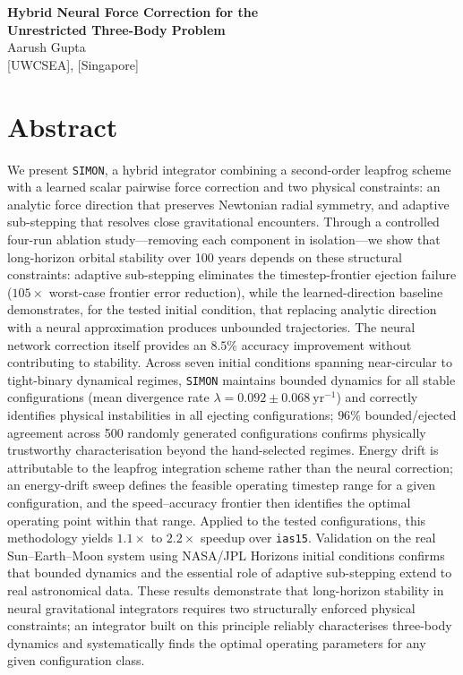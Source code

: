 \documentclass[12pt]{article}
\begin{document}
\newpage
{}
\setcounter{page}{1}
\thispagestyle{plain}

\begin{center}
  {\Large \textbf{Hybrid Neural Force Correction for the\\[0.2cm]
   Unrestricted Three-Body Problem}}\\[0.8cm]
  {\large Aarush Gupta}\\[0.3cm]
  {\small [UWCSEA], [Singapore]}\\[1cm]
\end{center}

\section*{Abstract}

We present \texttt{SIMON}, a hybrid integrator combining a second-order
leapfrog scheme with a learned scalar pairwise force correction and two
physical constraints: an analytic force direction that preserves Newtonian
radial symmetry, and adaptive sub-stepping that resolves close gravitational
encounters. Through a controlled four-run ablation study---removing each
component in isolation---we show that long-horizon orbital stability over
100 years depends on these structural constraints: adaptive sub-stepping
eliminates the timestep-frontier ejection failure ($105\times$ worst-case
frontier error reduction), while the learned-direction baseline demonstrates,
for the tested initial condition, that replacing analytic direction with a
neural approximation produces unbounded trajectories. The neural network
correction itself provides an $8.5\%$ accuracy improvement without
contributing to stability. Across seven initial conditions spanning
near-circular to tight-binary dynamical regimes, \texttt{SIMON} maintains
bounded dynamics for all stable configurations (mean divergence rate
$\lambda = 0.092 \pm 0.068\ \mathrm{yr}^{-1}$) and correctly identifies
physical instabilities in all ejecting configurations; $96\%$ bounded/ejected
agreement across 500 randomly generated configurations confirms physically
trustworthy characterisation beyond the hand-selected regimes. Energy drift
is attributable to the leapfrog integration scheme rather than the neural
correction; an energy-drift sweep defines the feasible operating timestep
range for a given configuration, and the speed--accuracy frontier then
identifies the optimal operating point within that range. Applied to the
tested configurations, this methodology yields $1.1\times$ to $2.2\times$
speedup over \texttt{ias15}. Validation on the real Sun--Earth--Moon system
using NASA/JPL Horizons initial conditions confirms that bounded dynamics and
the essential role of adaptive sub-stepping extend to real astronomical data.
These results demonstrate that long-horizon stability in neural gravitational
integrators requires two structurally enforced physical constraints; an
integrator built on this principle reliably characterises three-body dynamics
and systematically finds the optimal operating parameters for any given
configuration class.
\end{document}
